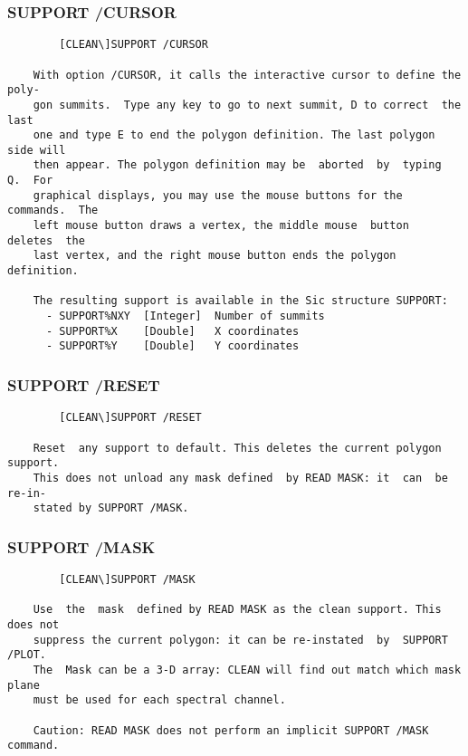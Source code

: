 \subsubsection{SUPPORT /CURSOR}
\begin{verbatim}
        [CLEAN\]SUPPORT /CURSOR

    With option /CURSOR, it calls the interactive cursor to define the poly-
    gon summits.  Type any key to go to next summit, D to correct  the  last
    one and type E to end the polygon definition. The last polygon side will
    then appear. The polygon definition may be  aborted  by  typing  Q.  For
    graphical displays, you may use the mouse buttons for the commands.  The
    left mouse button draws a vertex, the middle mouse  button  deletes  the
    last vertex, and the right mouse button ends the polygon definition.

    The resulting support is available in the Sic structure SUPPORT:
      - SUPPORT%NXY  [Integer]  Number of summits
      - SUPPORT%X    [Double]   X coordinates
      - SUPPORT%Y    [Double]   Y coordinates

\end{verbatim}
\subsubsection{SUPPORT /RESET}
\begin{verbatim}
        [CLEAN\]SUPPORT /RESET

    Reset  any support to default. This deletes the current polygon support.
    This does not unload any mask defined  by READ MASK: it  can  be  re-in-
    stated by SUPPORT /MASK.

\end{verbatim}
\subsubsection{SUPPORT /MASK}
\begin{verbatim}
        [CLEAN\]SUPPORT /MASK

    Use  the  mask  defined by READ MASK as the clean support. This does not
    suppress the current polygon: it can be re-instated  by  SUPPORT  /PLOT.
    The  Mask can be a 3-D array: CLEAN will find out match which mask plane
    must be used for each spectral channel.

    Caution: READ MASK does not perform an implicit SUPPORT /MASK command.

\end{verbatim}
